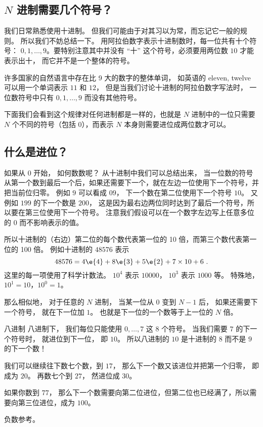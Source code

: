
\begin{issues}
\issueDraft
\end{issues}

\subsection{$N$ 进制需要几个符号？}
我们日常熟悉使用十进制。 但我们可能由于对其习以为常，而忘记它一般的规则。 所以我们不妨总结一下。 用阿拉伯数字表示十进制数时，每一位共有十个符号： $0,1,\dots, 9$。要特别注意其中并没有 “十” 这个符号，必须要用两位数 $10$ 才能表示出十， 而它并不是一个整体的符号。

许多国家的自然语言中存在比 9 大的数字的整体单词， 如英语的 eleven, twelve 可以用一个单词表示 $11$ 和 $12$， 但是当我们讨论十进制的阿拉伯数字写法时， 一位数符号中只有 $0,1,\dots, 9$ 而没有其他符号。 

下面我们会看到这个规律对任何进制都是一样的，也就是 $N$ 进制中的一位只需要 $N$ 个不同的符号（包括 0），而表示 $N$ 本身则需要进位成两位数才可以。

\subsection{什么是进位？}
如果从 $0$ 开始， 如何数数呢？ 从十进制中我们可以总结出来， 当一位数的符号从第一个数到最后一个后，如果还需要下一个，就在左边一位使用下一个符号，并把当前位归零。 例如 $9$ 可以看成 $09$， 下一个数在第二位使用下一个符号 $10$。 又例如 $199$ 的下一个数是 $200$， 这是因为最右边两位同时达到了最后一个符号，所以要在第三位使用下一个符号。 注意我们假设可以在一个数字左边写上任意多位的 $0$ 而不影响表示的值。

所以十进制的（右边）第二位的每个数代表第一位的 10 倍，而第三个数代表第一位的 100 倍。 例如十进制的 $48576$ 表示
\begin{equation}
48576 = 4\e{4} + 8\e{3} + 5\e{2} + 7\times 10 + 6~.
\end{equation}
这里的每一项使用了科学计数法。%
$10^4$ 表示 $10000$， $10^3$ 表示 $1000$ 等。 特殊地， $10^1=10$，$10^0=1$。

那么相似地， 对于任意的 $N$ 进制， 当某一位从 $0$ 变到 $N-1$ 后， 如果还需要下一个符号， 就在下一位加 $1$。 也就是下一位的一个数等于上一位的 $N$ 倍。

\begin{example}{八进制}
八进制下， 我们每位只能使用 $0,\dots,7$ 这 $8$ 个符号。 当我们需要 $7$ 的下一个符号时， 就进位到下一位， 即 $10$。 所以八进制的 $10$ 是十进制的 $8$ 而不是 $9$ 的下一个数！

我们可以继续往下数七个数，到 $17$， 那么下一个数又该进位并把第一个归零， 即成为 $20$。 再数七个到 $27$， 然进位成 $30$。

如果你数到 $77$， 那么下一个数需要向第二位进位，但第二位也已经满了，所以需要向第三位进位，成为 $100$。
\end{example}



负数参考。


